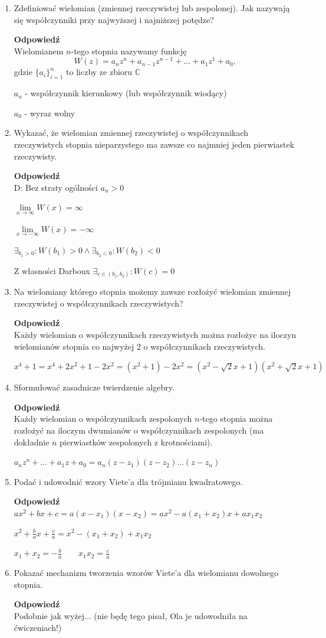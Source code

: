 \documentclass[12pt,a4paper]{article}
\newcounter{twierdzenie}
\theoremstyle{break}
\newcommand{\Odp}[1]{
		\begin{mdframed}[style=zadanie]
			\textbf{Odpowiedź}\\
			#1
		\end{mdframed}
	}
\begin{document}
\begin{enumerate}[1.]
{		Proszę... Tylko bez dowodu...
	}
	
	\item Zdeﬁniować wielomian (zmiennej rzeczywistej lub zespolonej). Jak nazywają się współczynniki przy najwyższej i najniższej potędze?
	\Odp{
		Wielomianem $n$-tego stopnia nazywamy funkcję
		$$W(z)=a_nz^n+a_{n-1}z^{n-1}+\dots+a_1z^1+a_0,$$
		gdzie $\{a_i\}_{i=1}^n$ to liczby ze zbioru $\mathbb{C}$
		
		$a_n$ - współczynnik kierunkowy (lub współczynnik wiodący)
		
		$a_0$ - wyraz wolny
	}
	
	\item Wykazać, że wielomian zmiennej rzeczywistej o współczynnikach rzeczywistych stopnia nieparzystego ma zawsze co najmniej jeden pierwiastek rzeczywisty.
	\Odp{
		D: Bez straty ogólności $a_n>0$
		
		$\lim\limits_{x\rightarrow \infty} W(x) = \infty$
		
		$\lim\limits_{x\rightarrow -\infty} W(x) = -\infty$
		
		$\exists_{b_1>0}: W(b_1)>0 \wedge \exists_{b_2<0}: W(b_2)<0$
		
		Z własności Darboux $\exists_{c\in (b_1,b_2)}: W(c)=0$
	}
	
	\item Na wielomiany którego stopnia możemy zawsze rozłożyć wielomian zmiennej rzeczywistej o współczynnikach rzeczywistych?
	\Odp{
		Każdy wielomian o współczynnikach rzeczywistych można rozłożyc na iloczyn wielomianów stopnia co najwyżej 2 o współczynnikach rzeczywistych.
		
		$x^4+1=x^4+2x^2+1-2x^2=(x^2+1)-2x^2 = (x^2-\sqrt{2}x+1)(x^2+\sqrt{2}x+1)$
	}
	
	\item Sformułować zasadnicze twierdzenie algebry.
	\Odp{
		Każdy wielomian o współczynnikach zespolonych $n$-tego stopnia można rozłożyć na iloczym dwumianów o współczynnikach zespolonych (ma dokładnie $n$ pierwiastków zespolonych z krotnościami).
		
		$a_nz^n+\dots+a_1z+a_0=a_n(z-z_1)(z-z_2)\dots(z-z_n)$
	}
	
	\item Podać i udowodnić wzory Viete’a dla trójmianu kwadratowego.
	\Odp{
		$ax^2+bx+c=a(x-x_1)(x-x_2)=ax^2 - a(x_1+x_2)x+ax_1x_2$
		
		$x^2+\frac{b}{a}x+\frac{c}{a}=x^2 - (x_1+x_2) + x_1x_2$
		
		$x_1+x_2 = -\frac{b}{a}\qquad x_1x_2=\frac{c}{a}$
	}
	\newpage
	\item Pokazać mechanizm tworzenia wzorów Viete’a dla wielomianu dowolnego stopnia.
	\Odp{
		Podobnie jak wyżej... (nie będę tego pisał, Ola je udowodniła na ćwiczeniach!)
	}
	

\end{enumerate}
\end{document}
